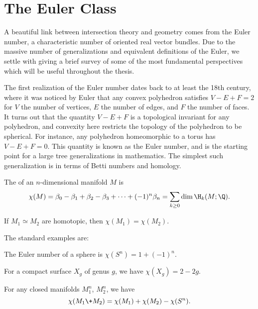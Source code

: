 \pagebreak
\section{The Euler Class}

A beautiful link between intersection theory and geometry comes from the Euler number, a characteristic number of oriented real vector bundles. Due to the massive number of generalizations and equivalent definitions of the Euler, we settle with giving a brief survey of some of the most fundamental perspectives which will be useful throughout the thesis.

The first realization of the Euler number dates back to at least the 18th century, where it was noticed by Euler that any convex polyhedron satisfies $V-E+F=2$ for $V$ the number of vertices, $E$ the number of edges, and $F$ the number of faces. 
It turns out that the quantity $V-E+F$ is a topological invariant for any polyhedron, and convexity here restricts the topology of the polyhedron to be spherical.
For instance, any polyhedron homeomorphic to a torus has $V-E+F=0$. 
This quantity is known as the Euler number, and is the starting point for a large tree generalizations in mathematics. 
The simplest such generalization is in terms of Betti numbers and homology.

\begin{definition}
  The  of an $n$-dimensional manifold $M$ is
  \[
    \chi(M) = \beta_0 - \beta_1 + \beta_2 - \beta_3 + \cdots + (-1)^n\beta_n = \sum_{k\geq 0} \dim \H_k(M; \Q).
  \]
\end{definition}

\begin{proposition}
  If $M_1\simeq M_2$ are homotopic, then $\chi(M_1)=\chi(M_2)$.
\end{proposition}

The standard examples are:

\begin{example}
  The Euler number of a sphere is $\chi(S^n)=1+(-1)^n$.
\end{example}

\begin{example}
  For a compact surface $X_g$ of genus $g$, we have $\chi(X_g)=2-2g$.
\end{example}

\begin{proposition}
  For any closed manifolds $M_1^n$, $M_2^n$, we have 
  \[\chi(M_1\+M_2)=\chi(M_1)+\chi(M_2)-\chi(S^n).\]
\end{proposition}

